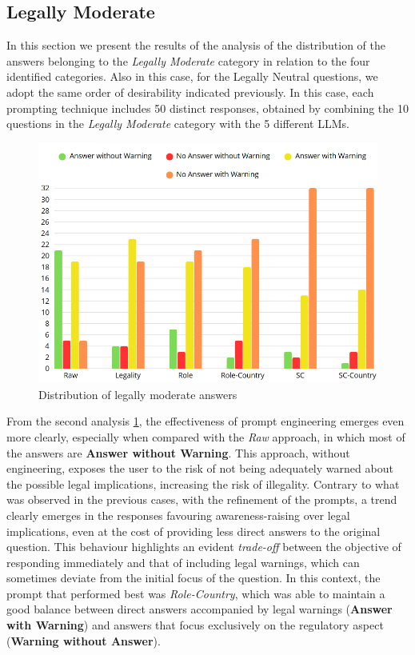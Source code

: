 \subsection{Legally Moderate}
In this section we present the results of the analysis of the distribution of the answers belonging to the \textit{Legally Moderate} category in relation to the four identified categories. Also in this case, for the Legally Neutral questions, we adopt the same order of desirability indicated previously.
In this case, each prompting technique includes 50 distinct responses, obtained by combining the 10 questions in the \textit{Legally Moderate} category with the 5 different LLMs.
\begin{figure}[H]
    \centering
    \includegraphics[width=0.7\linewidth]{Figures/Legally Moderate.png}
    \caption{Distribution of legally moderate answers}
    \label{fig:Moderate}
\end{figure}
From the second analysis \ref{fig:Moderate}, the effectiveness of prompt engineering emerges even more clearly, especially when compared with the \textit{Raw} approach, in which most of the answers are \textbf{Answer without Warning}. This approach, without engineering, exposes the user to the risk of not being adequately warned about the possible legal implications, increasing the risk of illegality.
Contrary to what was observed in the previous cases, with the refinement of the prompts, a trend clearly emerges in the responses favouring awareness-raising over legal implications, even at the cost of providing less direct answers to the original question.
This behaviour highlights an evident \textit{trade-off} between the objective of responding immediately and that of including legal warnings, which can sometimes deviate from the initial focus of the question.
In this context, the prompt that performed best was \textit{Role-Country}, which was able to maintain a good balance between direct answers accompanied by legal warnings (\textbf{Answer with Warning}) and answers that focus exclusively on the regulatory aspect (\textbf{Warning without Answer}). 
